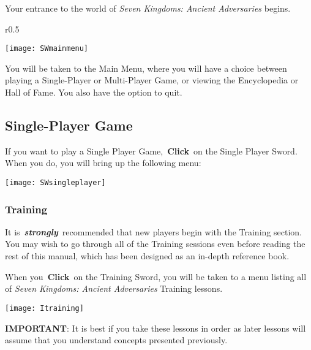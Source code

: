 Your entrance to the world of \textit{Seven Kingdoms: Ancient Adversaries} begins.

\begin{wrapfigure}{r}{0.5\textwidth}
	\begin{center}
		\vspace{-20pt}
		\texttt{[image: SWmainmenu]}
	\end{center}
	\vspace{-20pt}
\end{wrapfigure}

You will be taken to the Main Menu, where you will have a choice between playing a Single-Player or Multi-Player Game, or viewing the Encyclopedia or Hall of Fame. You also have the option to quit.

\clearpage

\subsection{Single-Player Game}


If you want to play a Single Player Game, \textbf{Click} on the Single Player Sword. When you do, you will bring up the following menu: 


\begin{center}
\texttt{[image: SWsingleplayer]}
\end{center}

\subsubsection{Training}

It is \textbf{\textit{strongly}} recommended that new players begin with the Training section. You may wish to go through all of the Training sessions even before reading the rest of this manual, which has been designed as an in-depth reference book.

When you \textbf{Click} on the Training Sword, you will be taken to a menu listing all of \textit{Seven Kingdoms: Ancient Adversaries} Training lessons.

\begin{center}
\texttt{[image: Itraining]}
\end{center}

\textbf{IMPORTANT}: It is best if you take these lessons in order as later lessons will assume that you understand concepts presented previously.


